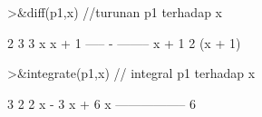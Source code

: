 \documentclass{article}
\begin{document}
\begin{eulernotebook}
\begin{eulercomment}
\begin{eulercomment}
\begin{euleroutput}
\end{euleroutput}
\begin{eulerprompt}
>&diff(p1,x) //turunan p1 terhadap x
\end{eulerprompt}
\begin{euleroutput}
  
                                2      3
                             3 x      x  + 1
                             ----- - --------
                             x + 1          2
                                     (x + 1)
  
\end{euleroutput}
\begin{eulerprompt}
>&integrate(p1,x) // integral p1 terhadap x
\end{eulerprompt}
\begin{euleroutput}
  
                               3      2
                            2 x  - 3 x  + 6 x
                            -----------------
                                    6
  

\end{euleroutput}
\end{eulercomment}
\end{eulercomment}
\end{eulernotebook}
\end{document}

